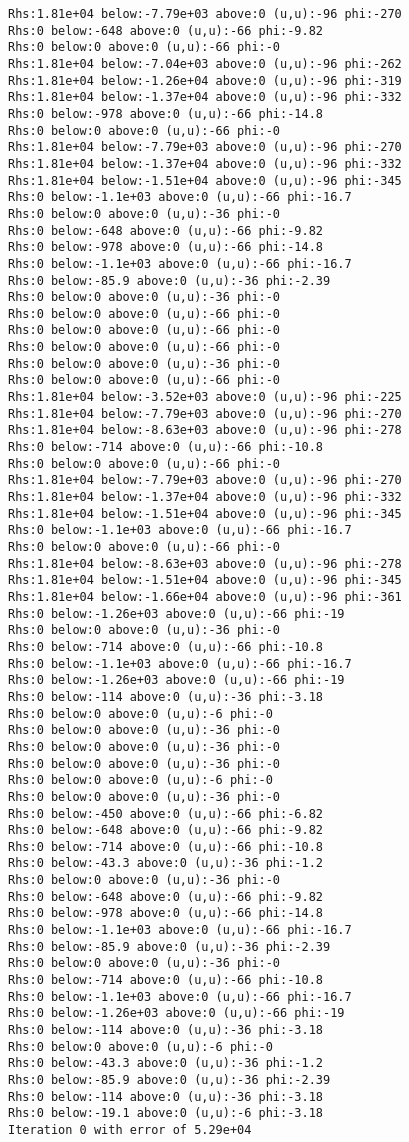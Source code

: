 \begin{verbatim}
Rhs:1.81e+04 below:-7.79e+03 above:0 (u,u):-96 phi:-270
Rhs:0 below:-648 above:0 (u,u):-66 phi:-9.82
Rhs:0 below:0 above:0 (u,u):-66 phi:-0
Rhs:1.81e+04 below:-7.04e+03 above:0 (u,u):-96 phi:-262
Rhs:1.81e+04 below:-1.26e+04 above:0 (u,u):-96 phi:-319
Rhs:1.81e+04 below:-1.37e+04 above:0 (u,u):-96 phi:-332
Rhs:0 below:-978 above:0 (u,u):-66 phi:-14.8
Rhs:0 below:0 above:0 (u,u):-66 phi:-0
Rhs:1.81e+04 below:-7.79e+03 above:0 (u,u):-96 phi:-270
Rhs:1.81e+04 below:-1.37e+04 above:0 (u,u):-96 phi:-332
Rhs:1.81e+04 below:-1.51e+04 above:0 (u,u):-96 phi:-345
Rhs:0 below:-1.1e+03 above:0 (u,u):-66 phi:-16.7
Rhs:0 below:0 above:0 (u,u):-36 phi:-0
Rhs:0 below:-648 above:0 (u,u):-66 phi:-9.82
Rhs:0 below:-978 above:0 (u,u):-66 phi:-14.8
Rhs:0 below:-1.1e+03 above:0 (u,u):-66 phi:-16.7
Rhs:0 below:-85.9 above:0 (u,u):-36 phi:-2.39
Rhs:0 below:0 above:0 (u,u):-36 phi:-0
Rhs:0 below:0 above:0 (u,u):-66 phi:-0
Rhs:0 below:0 above:0 (u,u):-66 phi:-0
Rhs:0 below:0 above:0 (u,u):-66 phi:-0
Rhs:0 below:0 above:0 (u,u):-36 phi:-0
Rhs:0 below:0 above:0 (u,u):-66 phi:-0
Rhs:1.81e+04 below:-3.52e+03 above:0 (u,u):-96 phi:-225
Rhs:1.81e+04 below:-7.79e+03 above:0 (u,u):-96 phi:-270
Rhs:1.81e+04 below:-8.63e+03 above:0 (u,u):-96 phi:-278
Rhs:0 below:-714 above:0 (u,u):-66 phi:-10.8
Rhs:0 below:0 above:0 (u,u):-66 phi:-0
Rhs:1.81e+04 below:-7.79e+03 above:0 (u,u):-96 phi:-270
Rhs:1.81e+04 below:-1.37e+04 above:0 (u,u):-96 phi:-332
Rhs:1.81e+04 below:-1.51e+04 above:0 (u,u):-96 phi:-345
Rhs:0 below:-1.1e+03 above:0 (u,u):-66 phi:-16.7
Rhs:0 below:0 above:0 (u,u):-66 phi:-0
Rhs:1.81e+04 below:-8.63e+03 above:0 (u,u):-96 phi:-278
Rhs:1.81e+04 below:-1.51e+04 above:0 (u,u):-96 phi:-345
Rhs:1.81e+04 below:-1.66e+04 above:0 (u,u):-96 phi:-361
Rhs:0 below:-1.26e+03 above:0 (u,u):-66 phi:-19
Rhs:0 below:0 above:0 (u,u):-36 phi:-0
Rhs:0 below:-714 above:0 (u,u):-66 phi:-10.8
Rhs:0 below:-1.1e+03 above:0 (u,u):-66 phi:-16.7
Rhs:0 below:-1.26e+03 above:0 (u,u):-66 phi:-19
Rhs:0 below:-114 above:0 (u,u):-36 phi:-3.18
Rhs:0 below:0 above:0 (u,u):-6 phi:-0
Rhs:0 below:0 above:0 (u,u):-36 phi:-0
Rhs:0 below:0 above:0 (u,u):-36 phi:-0
Rhs:0 below:0 above:0 (u,u):-36 phi:-0
Rhs:0 below:0 above:0 (u,u):-6 phi:-0
Rhs:0 below:0 above:0 (u,u):-36 phi:-0
Rhs:0 below:-450 above:0 (u,u):-66 phi:-6.82
Rhs:0 below:-648 above:0 (u,u):-66 phi:-9.82
Rhs:0 below:-714 above:0 (u,u):-66 phi:-10.8
Rhs:0 below:-43.3 above:0 (u,u):-36 phi:-1.2
Rhs:0 below:0 above:0 (u,u):-36 phi:-0
Rhs:0 below:-648 above:0 (u,u):-66 phi:-9.82
Rhs:0 below:-978 above:0 (u,u):-66 phi:-14.8
Rhs:0 below:-1.1e+03 above:0 (u,u):-66 phi:-16.7
Rhs:0 below:-85.9 above:0 (u,u):-36 phi:-2.39
Rhs:0 below:0 above:0 (u,u):-36 phi:-0
Rhs:0 below:-714 above:0 (u,u):-66 phi:-10.8
Rhs:0 below:-1.1e+03 above:0 (u,u):-66 phi:-16.7
Rhs:0 below:-1.26e+03 above:0 (u,u):-66 phi:-19
Rhs:0 below:-114 above:0 (u,u):-36 phi:-3.18
Rhs:0 below:0 above:0 (u,u):-6 phi:-0
Rhs:0 below:-43.3 above:0 (u,u):-36 phi:-1.2
Rhs:0 below:-85.9 above:0 (u,u):-36 phi:-2.39
Rhs:0 below:-114 above:0 (u,u):-36 phi:-3.18
Rhs:0 below:-19.1 above:0 (u,u):-6 phi:-3.18
Iteration 0 with error of 5.29e+04

\end{verbatim}


